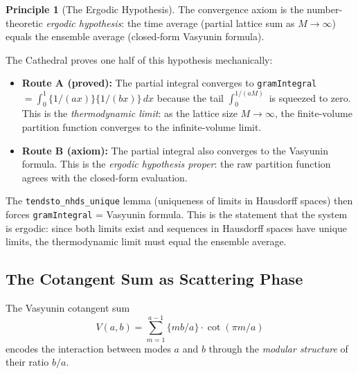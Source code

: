 \documentclass[11pt,a4paper]{article}
\theoremstyle{definition}
\newtheorem{principle}[definition]{Principle}
\newcommand{\fract}[1]{\{#1\}}
\newcommand{\lean}[1]{\texttt{#1}}
\begin{document}
\begin{principle}[The Ergodic Hypothesis]
The convergence axiom is the number-theoretic \emph{ergodic hypothesis}:
the time average (partial lattice sum as $M \to \infty$) equals the
ensemble average (closed-form Vasyunin formula).

The Cathedral proves one half of this hypothesis mechanically:
\begin{itemize}
  \item \textbf{Route A (proved):} The partial integral converges to
    \lean{gramIntegral}~$= \int_0^1 \fract{1/(ax)}\fract{1/(bx)}\,dx$
    because the tail $\int_0^{1/(aM)}$ is squeezed to zero.
    This is the \emph{thermodynamic limit}: as the lattice size
    $M \to \infty$, the finite-volume partition function converges
    to the infinite-volume limit.
  \item \textbf{Route B (axiom):} The partial integral also converges
    to the Vasyunin formula. This is the \emph{ergodic hypothesis proper}:
    the raw partition function agrees with the closed-form evaluation.
\end{itemize}
The \lean{tendsto\_nhds\_unique} lemma (uniqueness of limits in
Hausdorff spaces) then forces \lean{gramIntegral} = Vasyunin formula.
This is the statement that the system is ergodic: since both limits
exist and sequences in Hausdorff spaces have unique limits, the
thermodynamic limit must equal the ensemble average.
\end{principle}

\subsection{The Cotangent Sum as Scattering Phase}

The Vasyunin cotangent sum
\[
  V(a,b) = \sum_{m=1}^{a-1} \fract{mb/a} \cdot \cot(\pi m/a)
\]
encodes the interaction between modes $a$ and $b$ through the
\emph{modular structure} of their ratio $b/a$.
\end{document}
